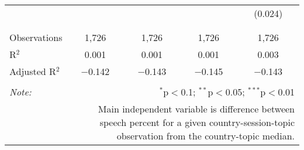 \begin{table}[!htbp]
\begin{tabular}{@{\extracolsep{5pt}}lcccc}
  &  &  &  & (0.024) \\ 
  & & & & \\ 
\hline \\[-1.8ex] 
Observations & 1,726 & 1,726 & 1,726 & 1,726 \\ 
R$^{2}$ & 0.001 & 0.001 & 0.001 & 0.003 \\ 
Adjusted R$^{2}$ & $-$0.142 & $-$0.143 & $-$0.145 & $-$0.143 \\ 
\hline 
\hline \\[-1.8ex] 
\textit{Note:}  & \multicolumn{4}{r}{$^{*}$p$<$0.1; $^{**}$p$<$0.05; $^{***}$p$<$0.01} \\ 
 & \multicolumn{4}{r}{Main independent variable is difference between speech percent for a given country-session-topic observation from the country-topic median.} \\ 
\end{tabular} 
\end{table} 
